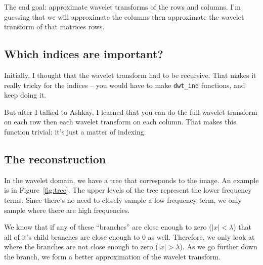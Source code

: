 \documentclass{article}
\begin{document}
            The end goal: approximate wavelet transforms of the rows and columns. I'm guessing that we will approximate the columns then approximate the wavelet transform of that matrices rows.

        \subsection{Which indices are important?}
            Initially, I thought that the wavelet transform had to be recursive. That makes it really tricky for the indices -- you would have to make \texttt{dwt\_ind} functions, and keep doing it. 

            But after I talked to Ashkay, I learned that you can do the full wavelet transform on each row then each wavelet transform on each column. That makes this function trivial: it's just a matter of indexing. 

        \subsection{The reconstruction}
            In the wavelet domain, we have a tree that corresponds to the image. An example is in Figure~\ref{fig:tree}. The upper levels of the tree represent the lower frequency terms. Since there's no need to closely sample a low frequency term, we only sample where there are high frequencies. 

            We know that if any of these ``branches'' are close enough to zero ($|x| < \lambda$) that all of it's child branches are close enough to 0 as well. Therefore, we only look at where the branches are not close enough to zero ($|x| > \lambda$). As we go further down the branch, we form a better approximation of the wavelet transform.
            
\end{document}
